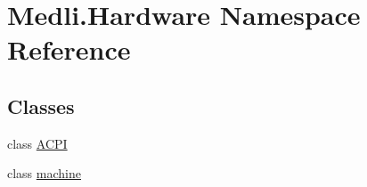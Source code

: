 \hypertarget{namespace_medli_1_1_hardware}{}\section{Medli.\+Hardware Namespace Reference}
\label{namespace_medli_1_1_hardware}
\subsection*{Classes}
\begin{DoxyCompactItemize}
\item 
class \hyperlink{class_medli_1_1_hardware_1_1_a_c_p_i}{A\+C\+PI}
\item 
class \hyperlink{class_medli_1_1_hardware_1_1machine}{machine}
\end{DoxyCompactItemize}
